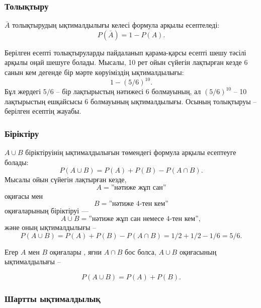 

\subsubsection{Толықтыру}

$\bar A$ толықтырудың ықтималдылығы келесі формула
арқылы есептеледі:
\[P(\bar A)=1-P(A).\]

Берілген есепті толықтыруларды пайдаланып қарама-қарсы есепті 
шешу тәсілі арқылы оңай шешуге болады.
Мысалы, 10 рет ойын сүйегін лақтырған кезде 
6 санын кем дегенде бір мәрте көруіміздің ықтималдылығы: 
\[1-(5/6)^{10}.\]
Бұл жердегі $5/6$ -- бір лақтырыстың нәтижесі 6 болмауының, ал $(5/6)^{10}$ -- 10 лақтырыстың ешқайсысы 6 болмауының ықтималдылығы. 
Осының толықтыруы -- берілген есептің жауабы.

\subsubsection{Біріктіру}

$A \cup B$ біріктіруінің ықтималдылығын төмендегі 
формула арқылы есептеуге болады:
\[P(A \cup B)=P(A)+P(B)-P(A \cap B).\]
Мысалы ойын сүйегін лақтырған кезде,
\[A=\textrm{''нәтиже жұп сан''}\] оқиғасы 
мен 
\[B=\textrm{''нәтиже 4-тен кем''}\] оқиғаларының
біріктіруі –– \[A \cup B=\textrm{''нәтиже жұп сан немесе 4-тен кем''},\]
және оның ықтималдылығы -- 
\[P(A \cup B) = P(A)+P(B)-P(A \cap B)=1/2+1/2-1/6=5/6.\]

Егер $A$ мен $B$ оқиғалары , яғни
$A \cap B$ бос болса, 
$A \cup B$ оқиғасының ықтималдылығы --

\[P(A \cup B)=P(A)+P(B).\]

\subsubsection{Шартты ықтималдылық}

